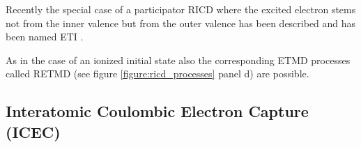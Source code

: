 Recently the special case of a participator \ac{RICD} where the excited
electron stems not from the inner valence but from the outer valence
has been described and has been named \ac{ETI} \cite{Kopelke11}.

As in the case of an ionized initial state also the corresponding ETMD processes
called RETMD (see figure \ref{figure:ricd_processes} panel d) are possible.




\subsection{Interatomic Coulombic Electron Capture (ICEC)}
